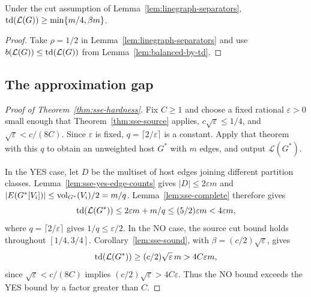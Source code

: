 \begin{corollary}\label{lem:sse-sound}
Under the cut assumption of Lemma~\ref{lem:linegraph-separators},
$\operatorname{td}(\mathcal L(G))\geq\min\{m/4,\beta m\}$.
\end{corollary}

\begin{proof}
Take $\rho=1/2$ in Lemma~\ref{lem:linegraph-separators} and use
$b(\mathcal L(G))\leq\operatorname{td}(\mathcal L(G))$ from
Lemma~\ref{lem:balanced-by-td}.
\end{proof}

\subsection{The approximation gap}

\begin{proof}[Proof of Theorem~\ref{thm:sse-hardness}]
Fix $C\geq1$ and choose a fixed rational $\varepsilon>0$ small enough
that Theorem~\ref{thm:sse-source} applies,
$c\sqrt\varepsilon\leq1/4$, and $\sqrt\varepsilon<c/(8C)$.
Since $\varepsilon$ is fixed, $q=\lceil2/\varepsilon\rceil$ is a
constant. Apply that theorem with this $q$ to obtain an
unweighted host $G^*$ with $m$ edges, and output $\mathcal L(G^*)$.

In the YES case, let $D$ be the multiset of host edges joining different
partition classes. Lemma~\ref{lem:sse-yes-edge-counts} gives
$|D|\leq2\varepsilon m$ and
$|E(G^*[V_i])|\leq\operatorname{vol}_{G^*}(V_i)/2=m/q$.
Lemma~\ref{lem:sse-complete} therefore gives
\[
 \operatorname{td}(\mathcal L(G^*))\leq2\varepsilon m+m/q
 \leq(5/2)\varepsilon m<4\varepsilon m,
\]
where $q=\lceil2/\varepsilon\rceil$ gives $1/q\leq\varepsilon/2$.
In the NO case, the source cut bound holds throughout $[1/4,3/4]$.
Corollary~\ref{lem:sse-sound}, with $\beta=(c/2)\sqrt\varepsilon$, gives
\[
 \operatorname{td}(\mathcal L(G^*))\geq(c/2)\sqrt\varepsilon\,m
 >4C\varepsilon m,
\]
since $\sqrt\varepsilon<c/(8C)$ implies
$(c/2)\sqrt\varepsilon>4C\varepsilon$. Thus the NO bound exceeds the YES
bound by a factor greater than $C$.
\end{proof}
